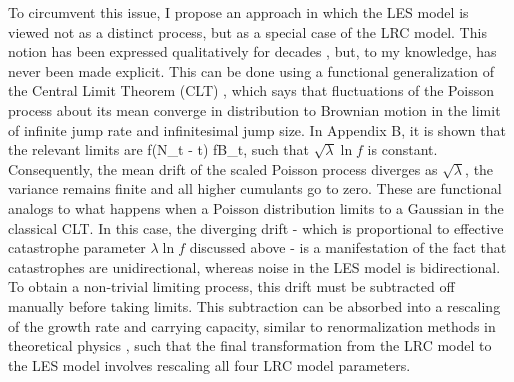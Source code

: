 To circumvent this issue, I propose an approach in which the LES model is viewed not as a distinct process, but as a special case of the LRC model.  This notion has been expressed qualitatively for decades \cite{shaffer1987minimum,lande1993risks}, but, to my knowledge, has never been made explicit.  This can be done using a functional generalization of the Central Limit Theorem (CLT) \cite{jacod2013limit}, which says that fluctuations of the Poisson process about its mean converge in distribution to Brownian motion in the limit of infinite jump rate and infinitesimal jump size.  In Appendix B, it is shown that the relevant limits are 
\be
\ln f(N_t - \lambda t)  \sqrt{\lambda} \ln fB_t,
\ee
\noindent such that $\sqrt{\lambda}\ln f$ is constant.  Consequently, the mean drift of the scaled Poisson process diverges as $\sqrt{\lambda}$, the variance remains finite and all higher cumulants go to zero.  These are functional analogs to what happens when a Poisson distribution limits to a Gaussian in the classical CLT.   In this case, the diverging drift - which is proportional to effective catastrophe parameter $\lambda\ln f$ discussed above - is a manifestation of the fact that catastrophes are unidirectional, whereas noise in the LES model is bidirectional.  To obtain a non-trivial limiting process, this drift must be subtracted off manually before taking limits.  This subtraction can be absorbed into a rescaling of the growth rate and carrying capacity, similar to renormalization methods in theoretical physics \cite{peskin1995quantum}, such that the final transformation from the LRC model to the LES model involves rescaling all four LRC model parameters.

